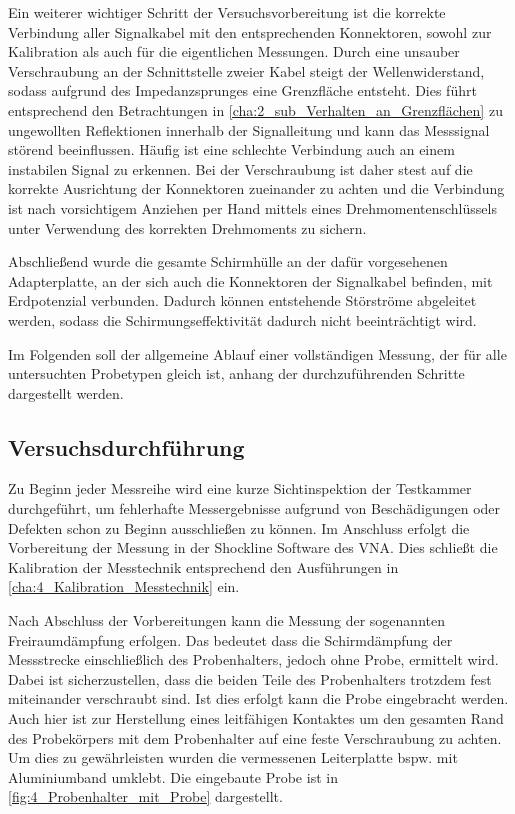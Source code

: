 Ein weiterer wichtiger Schritt der Versuchsvorbereitung ist die korrekte Verbindung aller Signalkabel mit den entsprechenden Konnektoren, sowohl zur Kalibration als auch für die eigentlichen Messungen. Durch eine unsauber Verschraubung an der Schnittstelle zweier Kabel steigt der Wellenwiderstand, sodass aufgrund des Impedanzsprunges eine Grenzfläche entsteht. Dies führt entsprechend den Betrachtungen in \Abschnitt\ref{cha:2_sub_Verhalten_an_Grenzflächen} zu ungewollten Reflektionen innerhalb der Signalleitung und kann das Messsignal störend beeinflussen. Häufig ist eine schlechte Verbindung auch an einem instabilen Signal zu erkennen. Bei der Verschraubung ist daher stest auf die korrekte Ausrichtung der Konnektoren zueinander zu achten und die Verbindung ist nach vorsichtigem Anziehen per Hand mittels eines Drehmomentenschlüssels unter Verwendung des korrekten Drehmoments zu sichern.
\par
\vspace{\linespace}
Abschließend wurde die gesamte Schirmhülle an der dafür vorgesehenen Adapterplatte, an der sich auch die Konnektoren der Signalkabel befinden, mit Erdpotenzial verbunden. Dadurch können entstehende Störströme abgeleitet werden, sodass die Schirmungseffektivität dadurch nicht beeinträchtigt wird. 
\par
\vspace{\linespace}
Im Folgenden soll der allgemeine Ablauf einer vollständigen Messung, der für alle untersuchten Probetypen gleich ist, anhang der durchzuführenden Schritte dargestellt werden. 


\subsection{Versuchsdurchführung}

Zu Beginn jeder Messreihe wird eine kurze Sichtinspektion der Testkammer durchgeführt, um fehlerhafte Messergebnisse aufgrund von Beschädigungen oder Defekten schon zu Beginn ausschließen zu können. Im Anschluss erfolgt die Vorbereitung der Messung in der Shockline Software des VNA. Dies schließt die Kalibration der Messtechnik entsprechend den Ausführungen in \Abschnitt\ref{cha:4_Kalibration_Messtechnik} ein.
\par
\vspace{\linespace}
Nach Abschluss der Vorbereitungen kann die Messung der sogenannten Freiraumdämpfung erfolgen. Das bedeutet dass die Schirmdämpfung der Messstrecke einschließlich des Probenhalters, jedoch ohne Probe, ermittelt wird. Dabei ist sicherzustellen, dass die beiden Teile des Probenhalters trotzdem fest miteinander verschraubt sind. Ist dies erfolgt kann die Probe eingebracht werden. Auch hier ist zur Herstellung eines leitfähigen Kontaktes um den gesamten Rand des Probekörpers mit dem Probenhalter auf eine feste Verschraubung zu achten. Um dies zu gewährleisten wurden die vermessenen Leiterplatte bspw. mit Aluminiumband umklebt. Die eingebaute Probe ist in \Abb\ref{fig:4_Probenhalter_mit_Probe} dargestellt.
\par
\vspace{\linespace}


